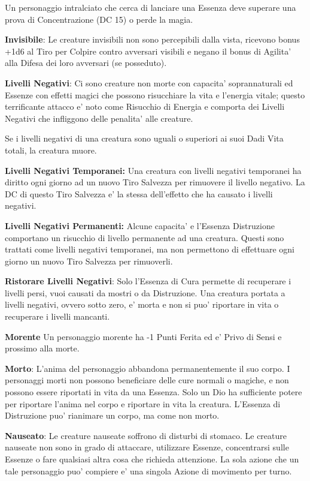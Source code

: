 \documentclass[a4paper,11pt,twoside,openany]{book}
\begin{document}
{		Un personaggio intralciato che cerca di lanciare una Essenza deve superare una prova di Concentrazione (DC 15) o perde la magia.
		
		\textbf{Invisibile}: Le creature invisibili non sono percepibili dalla vista, ricevono bonus +1d6 al Tiro per Colpire contro avversari visibili e negano il bonus di Agilita' alla Difesa dei loro avversari (se posseduto).
		
		\textbf{Livelli Negativi}: Ci sono creature non morte con capacita' soprannaturali ed Essenze con effetti magici che possono risucchiare la vita e l'energia vitale; questo terrificante attacco e' noto come Risucchio di Energia e comporta dei Livelli Negativi che infliggono delle penalita' alle creature.
		
		Se i livelli negativi di una creatura sono uguali o superiori ai suoi Dadi Vita totali, la creatura muore.
		
		\textbf{Livelli Negativi Temporanei:} Una creatura con livelli negativi temporanei ha diritto ogni giorno ad un nuovo Tiro Salvezza per rimuovere il livello negativo. La DC di questo Tiro Salvezza e' la stessa dell'effetto che ha causato i livelli negativi.
		
		\textbf{Livelli Negativi Permanenti:} Alcune capacita' e l'Essenza Distruzione comportano un risucchio di livello permanente ad una creatura. Questi sono trattati come livelli negativi temporanei, ma non permettono di effettuare ogni giorno un nuovo Tiro Salvezza per rimuoverli. 
		
		\textbf{Ristorare Livelli Negativi}: Solo l'Essenza di Cura permette di recuperare i livelli persi, vuoi causati da mostri o da Distruzione. Una creatura portata a livelli negativi, ovvero sotto zero, e' morta e non si puo' riportare in vita o recuperare i livelli mancanti.
		
		\textbf{Morente} Un personaggio morente ha -1 Punti Ferita ed e' Privo di Sensi e prossimo alla morte.
		
		\textbf{Morto}: L'anima del personaggio abbandona permanentemente il suo corpo. I personaggi morti non possono beneficiare delle cure normali o magiche, e non possono essere riportati in vita da una Essenza. Solo un Dio ha sufficiente potere per riportare l'anima nel corpo e riportare in vita la creatura. L'Essenza di Distruzione puo' rianimare un corpo, ma come non morto.
		
		\textbf{Nauseato}: Le creature nauseate soffrono di disturbi di stomaco.
		Le creature nauseate non sono in grado di attaccare, utilizzare Essenze, concentrarsi sulle Essenze o fare qualsiasi altra cosa che richieda attenzione. La sola azione che un tale personaggio puo' compiere e' una singola Azione di movimento per turno.
		
}
\end{document}
